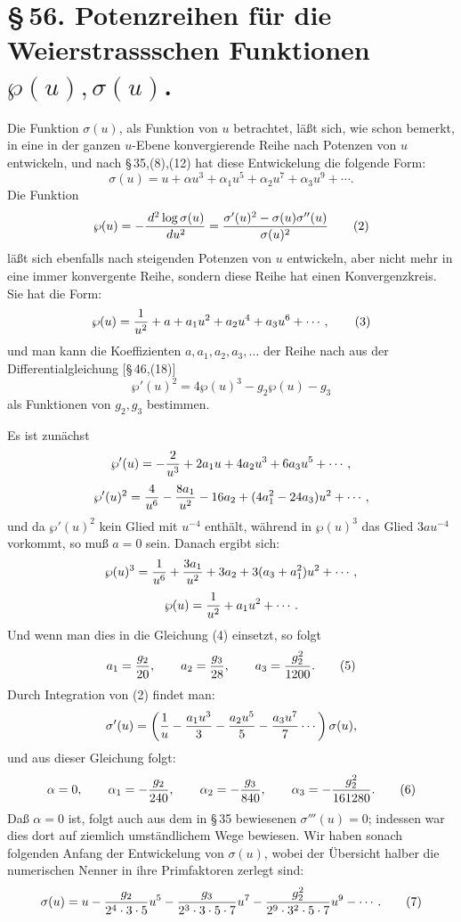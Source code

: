 \documentclass[11pt]{article}
\providecommand{\dd}{\,d}
\begin{document}
\section*{\S\,56. Potenzreihen für die Weierstrassschen Funktionen $\wp(u),\sigma(u)$.}

Die Funktion $\sigma(u)$, als Funktion von $u$ betrachtet, läßt sich, wie schon bemerkt, in eine in der ganzen $u$-Ebene konvergierende Reihe nach Potenzen von $u$ entwickeln, und nach \S\,35,(8),(12) hat diese Entwickelung die folgende Form:
\begin{equation}
\sigma(u)=u+\alpha u^3+\alpha_1u^5+\alpha_2u^7+\alpha_3u^9+\cdots.
\tag{1}
\end{equation}
Die Funktion
\begin{equation}
\wp(u)=-{\dd^2\log\sigma(u)\over\dd u^2}
={\sigma'(u)^2-\sigma(u)\sigma''(u)\over\sigma(u)^2}
\tag{2}
\end{equation}
läßt sich ebenfalls nach steigenden Potenzen von $u$ entwickeln, aber nicht mehr in eine immer konvergente Reihe, sondern diese Reihe hat einen Konvergenzkreis. Sie hat die Form:
\begin{equation}
\wp(u)={1\over u^2}+a+a_1u^2+a_2u^4+a_3u^6+\cdots,
\tag{3}
\end{equation}
und man kann die Koeffizienten $a,a_1,a_2,a_3,\ldots$ der Reihe nach aus der Differentialgleichung [\S\,46,(18)]
\begin{equation}
\wp'(u)^2=4\wp(u)^3-g_2\wp(u)-g_3
\tag{4}
\end{equation}
als Funktionen von $g_2,g_3$ bestimmen.

Es ist zunächst
\[
\wp'(u)=-{2\over u^3}+2a_1u+4a_2u^3+6a_3u^5+\cdots,
\]
\[
\wp'(u)^2={4\over u^6}-{8a_1\over u^2}-16a_2+(4a_1^2-24a_3)u^2+\cdots,
\]
und da $\wp'(u)^2$ kein Glied mit $u^{-4}$ enthält, während in $\wp(u)^3$ das Glied $3au^{-4}$ vorkommt, so muß $a=0$ sein. Danach ergibt sich:
\[
\wp(u)^3={1\over u^6}+{3a_1\over u^2}+3a_2+3(a_3+a_1^2)u^2+\cdots,
\]
\[
\wp(u)={1\over u^2}+a_1u^2+\cdots.
\]
Und wenn man dies in die Gleichung (4) einsetzt, so folgt
\begin{equation}
a_1={g_2\over20},
\qquad
a_2={g_3\over28},
\qquad
a_3={g_2^2\over1200}.
\tag{5}
\end{equation}
Durch Integration von (2) findet man:
\[
\sigma'(u)=\left({1\over u}-{a_1u^3\over3}-{a_2u^5\over5}-{a_3u^7\over7}\cdots\right)\sigma(u),
\]
und aus dieser Gleichung folgt:
\begin{equation}
\alpha=0,
\qquad
\alpha_1=-{g_2\over240},
\qquad
\alpha_2=-{g_3\over840},
\qquad
\alpha_3=-{g_2^2\over161280}.
\tag{6}
\end{equation}
Daß $\alpha=0$ ist, folgt auch aus dem in \S\,35 bewiesenen $\sigma'''(u)=0$; indessen war dies dort auf ziemlich umständlichem Wege bewiesen. Wir haben sonach folgenden Anfang der Entwickelung von $\sigma(u)$, wobei der Übersicht halber die numerischen Nenner in ihre Primfaktoren zerlegt sind:
\begin{equation}
\sigma(u)=u-{g_2\over2^4\cdot3\cdot5}u^5
-{g_3\over2^3\cdot3\cdot5\cdot7}u^7
-{g_2^2\over2^9\cdot3^2\cdot5\cdot7}u^9-\cdots.
\tag{7}
\end{equation}
\end{document}
